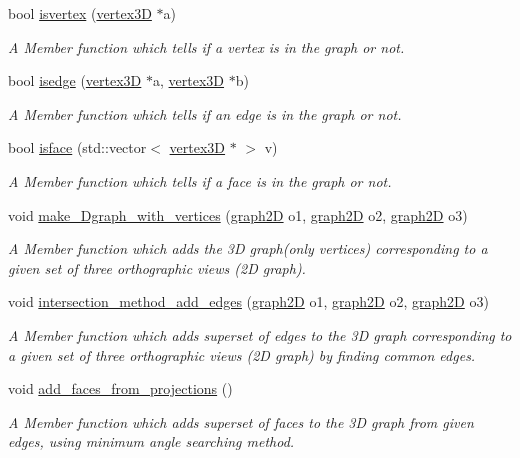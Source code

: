 \begin{DoxyCompactItemize}
bool \hyperlink{classgraph3D_a9d9e7f67e635b5aa896275072b39fbdd}{isvertex} (\hyperlink{classvertex3D}{vertex3D} $\ast$a)
\begin{DoxyCompactList}\small\item\em A Member function which tells if a vertex is in the graph or not. \end{DoxyCompactList}\item 
bool \hyperlink{classgraph3D_ac73a37d6b631a9ae96ab6822cf73c11f}{isedge} (\hyperlink{classvertex3D}{vertex3D} $\ast$a, \hyperlink{classvertex3D}{vertex3D} $\ast$b)
\begin{DoxyCompactList}\small\item\em A Member function which tells if an edge is in the graph or not. \end{DoxyCompactList}\item 
bool \hyperlink{classgraph3D_a30171eb80bcfeb866667964dcaf8f8a6}{isface} (std\+::vector$<$ \hyperlink{classvertex3D}{vertex3D} $\ast$ $>$ v)
\begin{DoxyCompactList}\small\item\em A Member function which tells if a face is in the graph or not. \end{DoxyCompactList}\item 
void \hyperlink{classgraph3D_aa9c7ef09439ee3f7433f80f1ec4798ba}{make\+\_\+Dgraph\+\_\+with\+\_\+vertices} (\hyperlink{classgraph2D}{graph2D} o1, \hyperlink{classgraph2D}{graph2D} o2, \hyperlink{classgraph2D}{graph2D} o3)
\begin{DoxyCompactList}\small\item\em A Member function which adds the 3D graph(only vertices) corresponding to a given set of three orthographic views (2D graph). \end{DoxyCompactList}\item 
void \hyperlink{classgraph3D_a4d45444d8a38ab79394a2e84b0b2e692}{intersection\+\_\+method\+\_\+add\+\_\+edges} (\hyperlink{classgraph2D}{graph2D} o1, \hyperlink{classgraph2D}{graph2D} o2, \hyperlink{classgraph2D}{graph2D} o3)
\begin{DoxyCompactList}\small\item\em A Member function which adds superset of edges to the 3D graph corresponding to a given set of three orthographic views (2D graph) by finding common edges. \end{DoxyCompactList}\item 
void \hyperlink{classgraph3D_aa79b2b133574a9ae324bc14f0d48fc02}{add\+\_\+faces\+\_\+from\+\_\+projections} ()
\begin{DoxyCompactList}\small\item\em A Member function which adds superset of faces to the 3D graph from given edges, using minimum angle searching method. \end{DoxyCompactList}\item 

\end{DoxyCompactItemize}
